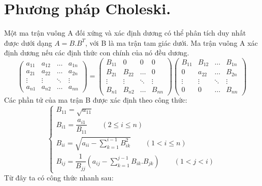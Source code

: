 \documentclass[12pt, a4paper]{report}
\begin{document}
\section{Phương pháp Choleski.}
Một ma trận vuông A đối xứng và xác định dương có thể phân tích duy nhất được dưới dạng $A=B.B^T$, với B là ma trận tam giác dưới. Ma trận vuông A xác định dương nếu các định thức con chính của nó đều dương.
\[
    \begin{pmatrix}
        a_{11} & a_{12} &  \dots  & a_{1n} \\
        a_{21} & a_{22} &  \dots  & a_{2n} \\
        \vdots & \vdots & \ddots & \vdots\\
        a_{n1} & a_{n2} &  \dots  & a_{nn}
    \end{pmatrix} = \begin{pmatrix}
        B_{11} & 0 & 0  & 0 \\
        B_{21} & B_{22} & \dots  & 0 \\
        \vdots & \vdots & \ddots & \vdots \\
        B_{n1} & B_{n2} & \dots  & B_{nn}
    \end{pmatrix} \begin{pmatrix}
        B_{11} & B_{12} &  \dots  & B_{1n} \\
        0 & a_{22} &  \dots  & B_{2n} \\
        \vdots & \vdots & \ddots & \vdots\\
        0 & 0 &  \dots  & B_{nn}
    \end{pmatrix}
\]
Các phần tử của ma trận B được xác định theo công thức:
\[
    \begin{cases}
        B_{11} = \sqrt{a_{11}} \\
        B_{i1} = \dfrac{a_{i1}}{B_{11}} \qquad (2 \leq i \leq n) \\
        B_{ii} = \sqrt{a_{ii} - \displaystyle \sum_{k=1}^{i-1} B^2_{ik}} \qquad (1 < i \leq n) \\
        B_{ij} = \dfrac{1}{B_{jj}} \left( a_{ij} - \displaystyle \sum_{k=1}^{j-1} B_{ik}.B_{jk} \right) \qquad (1<j<i)
    \end{cases}    
\]
Từ đây ta có công thức nhanh sau:
\end{document}
